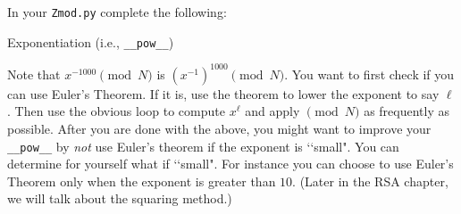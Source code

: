   In your \verb!Zmod.py! complete the following:
  \begin{enumerate}[nosep]
    \li Exponentiation (i.e., \verb!__pow__!)
  \end{enumerate}
  Note that $x^{-1000} \pmod{N}$ is $(x^{-1})^{1000} \pmod{N}$.
  You want to first check if you can use Euler's Theorem.
  If it is, use the theorem to lower the exponent to say $\ell$.
  Then use the obvious loop to compute $x^\ell$ and apply $\pmod{N}$
  as frequently as possible.
  After you are done with the above,
  you might want to improve your \texttt{\_\_pow\_\_} by
  \textit{not} use Euler's theorem
  if the exponent is \lq\lq small".
  You can determine for yourself what if \lq\lq small".
  For instance you can choose to use Euler's Theorem
  only when the exponent is greater than $10$.
  (Later in the RSA chapter, we will talk about the squaring method.)

